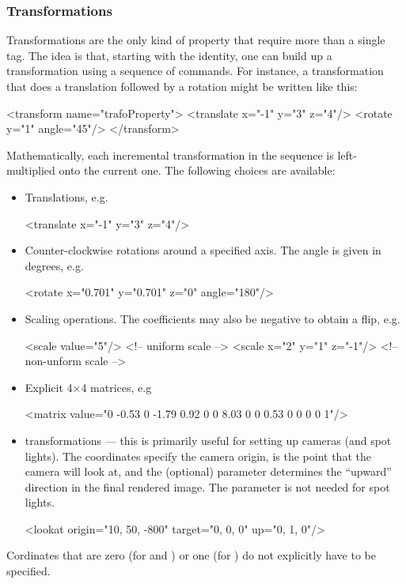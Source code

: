 \subsubsection{Transformations}
Transformations are the only kind of property that require more than a single tag. The idea is that, starting
with the identity, one can build up a transformation using a sequence of commands. For instance, a transformation that
does a translation followed by a rotation might be written like this:
\begin{xml}
<transform name="trafoProperty">
    <translate x="-1" y="3" z="4"/>
    <rotate y="1" angle="45"/>
</transform>
\end{xml}
Mathematically, each incremental transformation in the sequence is left-multiplied onto the current one. The following
choices are available:
\begin{itemize}
\item Translations, e.g.
\begin{xml}
<translate x="-1" y="3" z="4"/>
\end{xml}
\item Counter-clockwise rotations around a specified axis. The angle is given in degrees, e.g.
\begin{xml}
<rotate x="0.701" y="0.701" z="0" angle="180"/>
\end{xml}
\item Scaling operations. The coefficients may also be negative to obtain a flip, e.g.
\begin{xml}
<scale value="5"/>           <!-- uniform scale -->
<scale x="2" y="1" z="-1"/>  <!-- non-unform scale -->
\end{xml}
\item Explicit 4$\times$4 matrices, e.g
\begin{xml}
<matrix value="0 -0.53 0 -1.79 0.92 0 0 8.03 0 0 0.53 0 0 0 0 1"/>
\end{xml}
\item {} transformations --- this is primarily useful for setting up cameras (and spot lights). The  coordinates
specify the camera origin,  is the point that the camera will look at, and the
(optional)  parameter determines the ``upward'' direction in the final rendered image.
The  parameter is not needed for spot lights.
\begin{xml}
<lookat origin="10, 50, -800" target="0, 0, 0" up="0, 1, 0"/>
\end{xml}
\end{itemize}
Cordinates that are zero (for  and ) or one (for )
do not explicitly have to be specified.
\newpage
